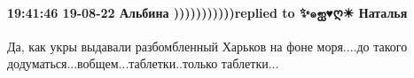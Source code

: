  
 
 
 
 

\paragraph{19:41:46 19-08-22 Альбина )))))))))))replied to ✨๑ஐ♥ღ☀ Наталья💛}

Да, как укры выдавали разбомбленный Харьков на фоне моря....до такого
додуматься...вобщем...таблетки..только таблетки...
